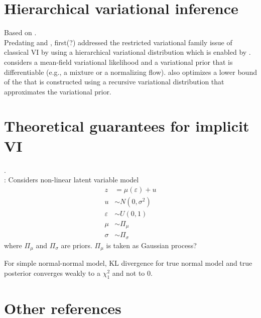 \documentclass[10pt]{article}
\begin{document}
\section{Hierarchical variational inference}

Based on \citet{Ranganath:2016}.
\\

Predating \sivi and \uivi, \hvm first(?) addressed the restricted variational family issue of classical VI by using a hierarchical variational distribution which is enabled by \bbvi. \hvm considers a mean-field variational likelihood and a variational prior that is differentiable (e.g., a mixture or a normalizing flow). \hvm also optimizes a lower bound of the \elbo that is constructed using a recursive variational distribution that approximates the variational prior.


\newpage


\section{Theoretical guarantees for implicit VI}

\citet{Plummer:2021}.
\\

\todo: Considers non-linear latent variable model
\begin{align*}
z &= \mu(\varepsilon) + u \\
u &\sim N(0,\sigma^2) \\
\varepsilon &\sim U(0,1) \\
\mu &\sim \Pi_\mu \\
\sigma &\sim \Pi_\sigma
\end{align*}
where $\Pi_\mu$ and $\Pi_\sigma$ are priors. $\Pi_\mu$ is taken as Gaussian process?

For simple normal-normal model, KL divergence for true normal model and true posterior converges weakly to a $\chi_1^2$ and not to 0.


\newpage


\section{Other references}
\end{document}
